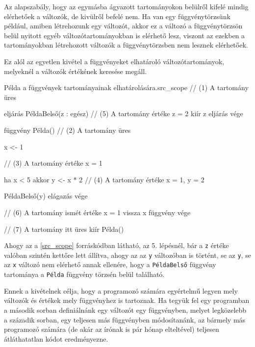 
Az alapszabály, hogy az egymásba ágyazott tartományokon belülről kifelé mindig elérhetőek a változók, de kivülről befelé nem. Ha van egy függvénytörzsünk például, amiben létrehozunk egy változót, akkor ez a változó a függvénytörzsön belül nyitott egyéb változótartományokban is elérhető lesz, viszont az ezekben a tartományokban létrehozott változók a függvénytörzsben nem lesznek elérhetőek.

Ez alól az egyetlen kivétel a függvényeket elhatároló változótartományok, melyeknél a változók értékének keresése megáll.

\begin{code}{Példa a függvények tartományainak elhatárolására.}{src_scope}
// (1) A tartomány üres

eljárás PéldaBelső(z : egész)
    // (5) A tartomány értéke {z = 2}
    kiír z
eljárás vége

függvény Példa()
    // (2) A tartomány üres

    x <- 1

    // (3) A tartomány értéke {x = 1}

    ha x < 5 akkor
        y <- x * 2
        // (4) A tartomány értéke {x = 1, y = 2}

        PéldaBelső(y)
    elágazás vége

    // (6) A tartomány ismét értéke {x = 1}
    vissza x
függvény vége

// (7) A tartomány itt üres
kiír Példa()
\end{code}

Ahogy az a \ref{src_scope} forráskódban látható, az 5. lépésnél, bár a \texttt{z} értéke valóban szintén kettőre lett állítva, ahogy az az \texttt{y} változóban is történt, se az \texttt{y}, se az \texttt{x} változó nem elérhető annak ellenére, hogy a \texttt{PéldaBelső} függvény tartománya a \texttt{Példa} függvény törzsén belül található.

Ennek a kivételnek célja, hogy a programozó számára egyértelmű legyen mely változók és értékek mely függvényhez is tartoznak. Ha tegyük fel egy programban a második sorban definiálnánk egy változót egy függvényben, melyet legközelebb a századik sorban, egy teljesen más függvényben módosítanánk, az bármely más programozó számára (de akár az írónak is pár hónap elteltével) teljesen átláthatatlan kódot eredményezne.

